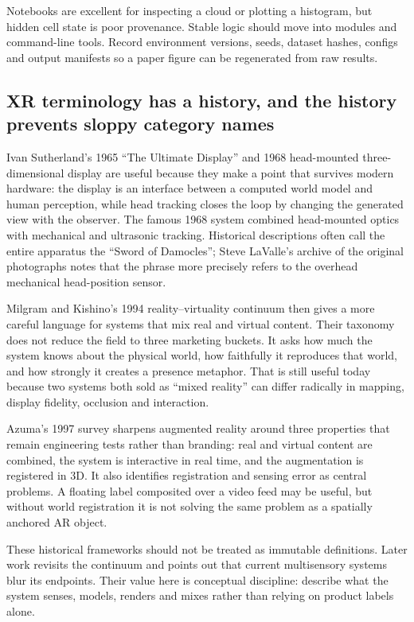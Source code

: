 Notebooks are excellent for inspecting a cloud or plotting a histogram, but hidden cell state is poor provenance. Stable logic should move into modules and command-line tools. Record environment versions, seeds, dataset hashes, configs and output manifests so a paper figure can be regenerated from raw results.

\subsection{XR terminology has a history, and the history prevents sloppy category names}\label{04-visual-computing-ii-ch035-xr-terminology-has-a-history-and-the-history-prevents-sloppy-category-names}

Ivan Sutherland's 1965 ``The Ultimate Display'' and 1968 head-mounted three-dimensional display are useful because they make a point that survives modern hardware: the display is an interface between a computed world model and human perception, while head tracking closes the loop by changing the generated view with the observer. The famous 1968 system combined head-mounted optics with mechanical and ultrasonic tracking. Historical descriptions often call the entire apparatus the ``Sword of Damocles''; Steve LaValle's archive of the original photographs notes that the phrase more precisely refers to the overhead mechanical head-position sensor.

Milgram and Kishino's 1994 reality--virtuality continuum then gives a more careful language for systems that mix real and virtual content. Their taxonomy does not reduce the field to three marketing buckets. It asks how much the system knows about the physical world, how faithfully it reproduces that world, and how strongly it creates a presence metaphor. That is still useful today because two systems both sold as ``mixed reality'' can differ radically in mapping, display fidelity, occlusion and interaction.

Azuma's 1997 survey sharpens augmented reality around three properties that remain engineering tests rather than branding: real and virtual content are combined, the system is interactive in real time, and the augmentation is registered in 3D. It also identifies registration and sensing error as central problems. A floating label composited over a video feed may be useful, but without world registration it is not solving the same problem as a spatially anchored AR object.

These historical frameworks should not be treated as immutable definitions. Later work revisits the continuum and points out that current multisensory systems blur its endpoints. Their value here is conceptual discipline: describe what the system senses, models, renders and mixes rather than relying on product labels alone.

